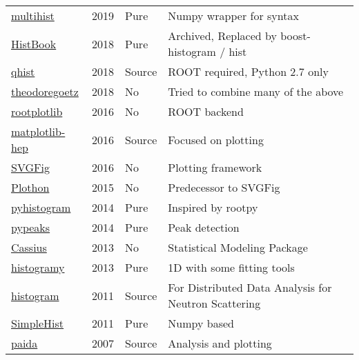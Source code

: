 \documentclass{webofc}
\begin{document}
\begin{table}
\begin{tabular}{llll}
		\href{https://pypi.org/project/multihist/}{multihist}                        & 2019         & Pure   & Numpy wrapper for syntax                             \\
		\href{https://github.com/scikit-hep/histbook}{HistBook}                      & 2018         & Pure   & Archived, Replaced by boost-histogram / hist         \\
		\href{https://pypi.org/project/qhist/}{qhist}                                & 2018         & Source & ROOT required, Python 2.7 only                       \\
		\href{https://github.com/theodoregoetz/histogram}{theodoregoetz}             & 2018         & No     & Tried to combine many of the above                   \\
		\href{https://github.com/drdavis/rootplotlib}{rootplotlib}                   & 2016         & No     & ROOT backend                                         \\
		\href{https://pypi.org/project/matplotlib-hep/}{matplotlib-hep}              & 2016         & Source & Focused on plotting                                  \\
		\href{https://github.com/jpivarski/svgfig}{SVGFig}                           & 2016         & No     & Plotting framework                                   \\
		\href{https://github.com/jpivarski/plothon}{Plothon}                         & 2015         & No     & Predecessor to SVGFig                                \\
		\href{https://pypi.org/project/pyhistogram/}{pyhistogram}                    & 2014         & Pure   & Inspired by rootpy                                   \\
		\href{https://pypi.org/project/pypeaks}{pypeaks}                             & 2014         & Pure   & Peak detection                                       \\
		\href{https://github.com/opendatagroup/cassius}{Cassius}                     & 2013         & No     & Statistical Modeling Package                         \\
		\href{https://pypi.org/project/histogramy}{histogramy}                       & 2013         & Pure   & 1D with some fitting tools                           \\
		\href{https://pypi.org/project/histogram}{histogram}                         & 2011         & Source & For Distributed Data Analysis for Neutron Scattering \\
		\href{https://pypi.org/project/SimpleHist/}{SimpleHist}                      & 2011         & Pure   & Numpy based                                          \\
		\href{https://pypi.org/project/paida/}{paida}                                & 2007         & Source & Analysis and plotting                                \\ \hline
	\end{tabular}
\end{table}
\end{document}
